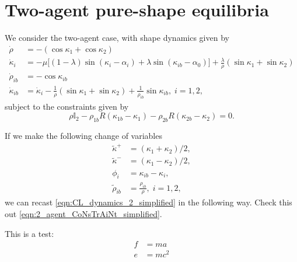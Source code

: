 \section{Two-agent pure-shape equilibria}

We consider the two-agent case, with shape dynamics given by
\begin{align}
\dot{\rho} &= - (\cos\kappa_1 + \cos\kappa_2) 
\\
\dot{\kappa}_i &= - \mu \Big[(1 - \lambda)\sin(\kappa_i - \alpha_i) + \lambda \sin(\kappa_{ib} - \alpha_0) \Big] + \frac{\lambda}{\rho}(\sin\kappa_1 + \sin\kappa_2) 
\\
\dot{\rho}_{ib} &= - \cos\kappa_{ib}  
\\
\dot{\kappa}_{ib} &= \dot{\kappa}_i - \frac{1}{\rho}(\sin\kappa_1 + \sin\kappa_2) + \frac{1}{\rho_{ib}} \sin\kappa_{ib},  \; i=1,2,
\label{eqn:CL_dynamics_2_simplified}
\end{align}
subject to the constraints given by
\begin{equation}
\rho \mathbb{I}_2 - \rho_{1b} R(\kappa_{1b} - \kappa_1) - \rho_{2b} R(\kappa_{2b} - \kappa_{2}) = 0. 
\label{eqn:2_agent_CoNsTrAiNt_simplified}
\end{equation}

If we make the following change of variables
\begin{align*}
\tilde{\kappa}^+ 
&= (\kappa_1 + \kappa_2)/2,
\nonumber \\
\tilde{\kappa}^- 
&= 
(\kappa_1 - \kappa_2)/2,
\nonumber \\
\phi_{i} 
&= 
\kappa_{ib} - \kappa_i,
\nonumber \\
\tilde{\rho}_{ib} 
&= 
\frac{\rho_{ib} }{\rho}, 
\; i=1,2,
\end{align*}
we can recast \eqref{eqn:CL_dynamics_2_simplified} in the following way. Check this out \eqref{eqn:2_agent_CoNsTrAiNt_simplified}.

This is a test:
\begin{align}
f &= ma \nonumber \\
e & =mc^2
\end{align}

  
  
  
  
  
  
  
  
  
  
  